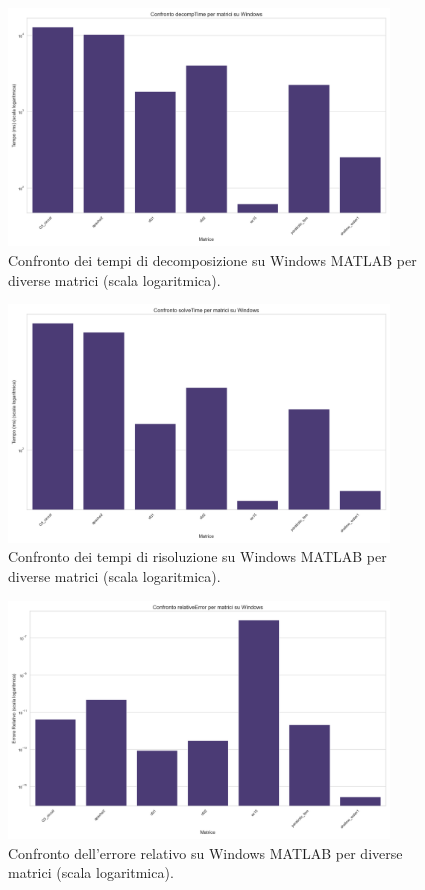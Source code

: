 \begin{figure}[H]
    \centering
    \includegraphics[width=0.9\textwidth]{images/MATLAB/Windows/decompTime_comparison}
    \caption{Confronto dei tempi di decomposizione su Windows MATLAB per diverse matrici (scala logaritmica).}
    \label{fig:matlab-windows-decomp-comparison}
\end{figure}

\begin{figure}[H]
    \centering
    \includegraphics[width=0.9\textwidth]{images/MATLAB/Windows/solveTime_comparison}
    \caption{Confronto dei tempi di risoluzione su Windows MATLAB per diverse matrici (scala logaritmica).}
    \label{fig:matlab-windows-solve-comparison}
\end{figure}

\begin{figure}[H]
    \centering
    \includegraphics[width=0.9\textwidth]{images/MATLAB/Windows/relativeError_comparison}
    \caption{Confronto dell'errore relativo su Windows MATLAB per diverse matrici (scala logaritmica).}
    \label{fig:matlab-windows-error-comparison}
\end{figure}

